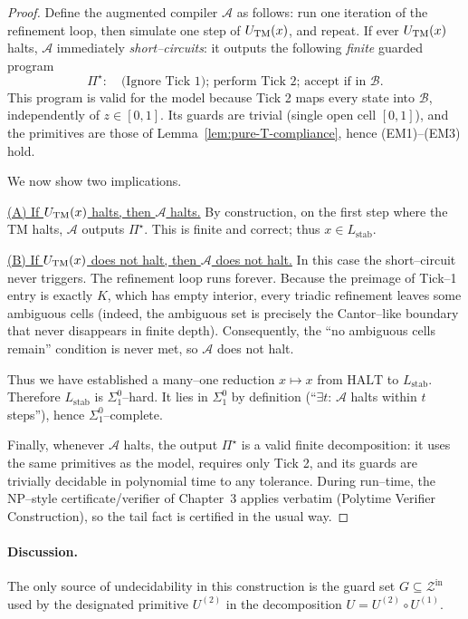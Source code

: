 \documentclass[12pt]{article}
\theoremstyle{definition}
\theoremstyle{plain}
\begin{document}
\begin{proof}
Define the augmented compiler \(\mathcal A\) as follows: run one iteration of the refinement loop, then simulate one step of \(U_{\rm TM}(x)\), and repeat. If ever \(U_{\rm TM}(x)\) halts, \(\mathcal A\) immediately \emph{short–circuits}: it outputs the following \emph{finite} guarded program
\[
\Pi^\star:\quad\text{(Ignore Tick 1); perform Tick 2; accept if in }\mathcal B.
\]
This program is valid for the model because Tick 2 maps every state into \(\mathcal B\), independently of \(z\in[0,1]\). Its guards are trivial (single open cell \([0,1]\)), and the primitives are those of Lemma~\ref{lem:pure-T-compliance}, hence (EM1)–(EM3) hold.

We now show two implications.

\underline{(A) If \(U_{\rm TM}(x)\) halts, then \(\mathcal A\) halts.}
By construction, on the first step where the TM halts, \(\mathcal A\) outputs \(\Pi^\star\). This is finite and correct; thus \(x\in L_{\mathrm{stab}}\).

\underline{(B) If \(U_{\rm TM}(x)\) does not halt, then \(\mathcal A\) does not halt.}
In this case the short–circuit never triggers. The refinement loop runs forever. Because the preimage of Tick–1 entry is exactly \(K\), which has empty interior, every triadic refinement leaves some ambiguous cells (indeed, the ambiguous set is precisely the Cantor–like boundary that never disappears in finite depth). Consequently, the “no ambiguous cells remain” condition is never met, so \(\mathcal A\) does not halt.

Thus we have established a many–one reduction \(x\mapsto x\) from \(\mathrm{HALT}\) to \(L_{\mathrm{stab}}\). Therefore \(L_{\mathrm{stab}}\) is \(\Sigma^0_1\)–hard. It lies in \(\Sigma^0_1\) by definition (“\(\exists t\): \(\mathcal A\) halts within \(t\) steps”), hence \(\Sigma^0_1\)–complete.

Finally, whenever \(\mathcal A\) halts, the output \(\Pi^\star\) is a valid finite decomposition: it uses the same primitives as the model, requires only Tick 2, and its guards are trivially decidable in polynomial time to any tolerance. During run–time, the NP–style certificate/verifier of Chapter~3 applies verbatim (Polytime Verifier Construction), so the tail fact is certified in the usual way. 
\end{proof}

\paragraph{Discussion.}
The only source of undecidability in this construction is the guard set $G\subseteq \mathcal Z^{\mathrm{in}}$ used by the designated primitive $U^{(2)}$ in the decomposition $U=U^{(2)}\circ U^{(1)}$. 
\end{document}
